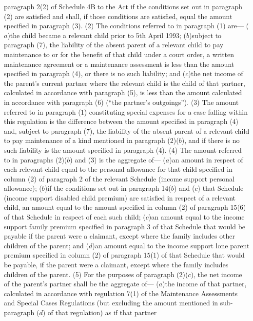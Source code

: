 \documentclass[a4paper]{article}
\begin{document}
paragraph 2(2) of Schedule 4B to the Act if the conditions set out in paragraph
(2) are satisfied and shall, if those conditions are satisfied, equal the amount
specified in paragraph (3).
(2) The conditions referred to in paragraph (1) are—
($a$)the child became a relevant child prior to 5th April 1993;
($b$)subject to paragraph (7), the liability of the absent parent of a relevant
child to pay maintenance to or for the benefit of that child under a court
order, a written maintenance agreement or a maintenance assessment is less than
the amount specified in paragraph (4), or there is no such liability; and
($c$)the net income of the parent’s current partner where the relevant child is
the child of that partner, calculated in accordance with paragraph (5), is less
than the amount calculated in accordance with paragraph (6) (“the partner’s
outgoings”).
(3) The amount referred to in paragraph (1) constituting special expenses for a
case falling within this regulation is the difference between the amount
specified in paragraph (4) and, subject to paragraph (7), the liability of the
absent parent of a relevant child to pay maintenance of a kind mentioned in
paragraph (2)($b$), and if there is no such liability is the amount specified in
paragraph (4).
(4) The amount referred to in paragraphs (2)($b$) and (3) is the aggregate of—
($a$)an amount in respect of each relevant child equal to the personal allowance
for that child specified in column (2) of paragraph 2 of the relevant Schedule
(income support personal allowance);
($b$)if the conditions set out in paragraph 14($b$) and ($c$) that Schedule (income
support disabled child premium) are satisfied in respect of a relevant child, an
amount equal to the amount specified in column (2) of paragraph 15(6) of that
Schedule in respect of each such child;
($c$)an amount equal to the income support family premium specified in paragraph 3
of that Schedule that would be payable if the parent were a claimant, except
where the family includes other children of the parent; and
($d$)an amount equal to the income support lone parent premium specified in column
(2) of paragraph 15(1) of that Schedule that would be payable, if the parent
were a claimant, except where the family includes children of the parent.
(5) For the purposes of paragraph (2)($c$), the net income of the parent’s partner
shall be the aggregate of—
($a$)the income of that partner, calculated in accordance with regulation 7(1) of
the Maintenance Assessments and Special Cases Regulations (but excluding the
amount mentioned in sub-paragraph ($d$) of that regulation) as if that partner
\end{document}
